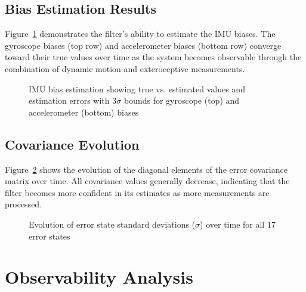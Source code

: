 \documentclass[11pt,a4paper]{article}
\begin{document}
\subsection{Bias Estimation Results}

Figure~\ref{fig:bias_estimation} demonstrates the filter's ability to estimate the IMU biases. The gyroscope biases (top row) and accelerometer biases (bottom row) converge toward their true values over time as the system becomes observable through the combination of dynamic motion and exteroceptive measurements.

\begin{figure}[h]
    \centering
    \caption{IMU bias estimation showing true vs. estimated values and estimation errors with $3\sigma$ bounds for gyroscope (top) and accelerometer (bottom) biases}
    \label{fig:bias_estimation}
\end{figure}

\subsection{Covariance Evolution}

Figure~\ref{fig:covariance} shows the evolution of the diagonal elements of the error covariance matrix over time. All covariance values generally decrease, indicating that the filter becomes more confident in its estimates as more measurements are processed.

\begin{figure}[h]
    \centering
    \caption{Evolution of error state standard deviations ($\sigma$) over time for all 17 error states}
    \label{fig:covariance}
\end{figure}
\section{Observability Analysis}
\label{sec:observability}
\end{document}
